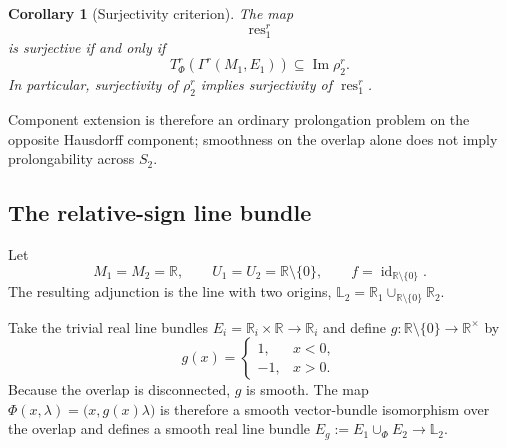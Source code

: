 \documentclass[11pt]{article}
\theoremstyle{plain}
\newtheorem{corollary}[theorem]{Corollary}
\theoremstyle{definition}
\newcommand{\Ltwo}{\mathbb{L}_{2}}
\begin{document}
\begin{corollary}[Surjectivity criterion]
\label{cor:restriction-surjectivity}
The map
\[
  \operatorname{res}_1^r
\]
is surjective if and only if
\[
  T_\Phi^r
  \left(
    \Gamma^r(M_1,E_1)
  \right)
  \subseteq
  \operatorname{Im}\rho_2^r.
\]
In particular, surjectivity of \(\rho_2^r\) implies surjectivity of
\(\operatorname{res}_1^r\).
\end{corollary}

Component extension is therefore an ordinary prolongation problem on the opposite Hausdorff component; smoothness on the overlap alone does not imply prolongability across \(S_2\).

\subsection{The relative-sign line bundle}
\label{subsec:relative-sign-bundle}

Let
\[
  M_1=M_2=\mathbb R,
  \qquad
  U_1=U_2=\mathbb R\setminus\{0\},
  \qquad
  f=\operatorname{id}_{\mathbb R\setminus\{0\}}.
\]
The resulting adjunction is the line with two origins,
\(\Ltwo = \mathbb R_1 \cup_{\mathbb R\setminus\{0\}} \mathbb R_2\).

Take the trivial real line bundles \(E_i=\mathbb R_i\times\mathbb R \longrightarrow \mathbb R_i\) and define \(g:\mathbb R\setminus\{0\} \longrightarrow \mathbb R^\times\) by
\[
  g(x)
  =
  \begin{cases}
    1,&x<0,\\
    -1,&x>0.
  \end{cases}
\]
Because the overlap is disconnected, \(g\) is smooth. The map \(\Phi(x,\lambda) = \bigl(x,g(x)\lambda\bigr)\) is therefore a smooth vector-bundle isomorphism over the overlap and
defines a smooth real line bundle
\(E_g := E_1\cup_\Phi E_2 \longrightarrow \Ltwo\).
\end{document}
